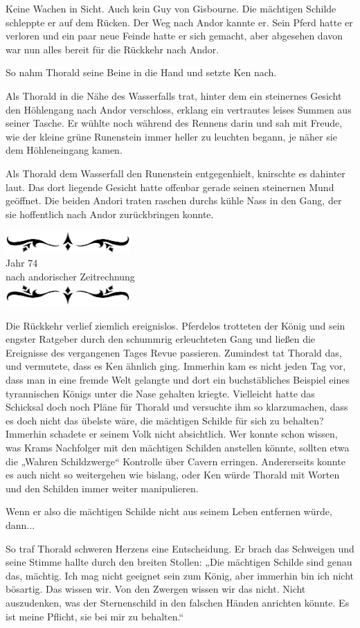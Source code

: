 \documentclass[10pt, a4paper, oneside]{book}
\newcommand{\az}[1]{%
    \begin{center}
        \includegraphics[width=180px]{Das Erbe des Wunderkindes/verzierung1.png}\\
        {\Huge #1} \\
        {nach andorischer Zeitrechnung}\\
        \includegraphics[width=180px]{Das Erbe des Wunderkindes/verzierung2.png}
    \end{center}
    \extramarks{}{#1 a.Z.}
}
\begin{document}
Keine Wachen in Sicht. Auch kein Guy von Gisbourne. Die mächtigen Schilde schleppte er auf dem Rücken. Der Weg nach Andor kannte er. Sein Pferd hatte er verloren und ein paar neue Feinde hatte er sich gemacht, aber abgesehen davon war nun alles bereit für die Rückkehr nach Andor.

So nahm Thorald seine Beine in die Hand und setzte Ken nach.\bigskip







Als Thorald in die Nähe des Wasserfalls trat, hinter dem ein steinernes Gesicht den Höhlengang nach Andor verschloss, erklang ein vertrautes leises Summen aus seiner Tasche. Er wühlte noch während des Rennens darin und sah mit Freude, wie der kleine grüne Runenstein immer heller zu leuchten begann, je näher sie dem Höhleneingang kamen.

Als Thorald dem Wasserfall den Runenstein entgegenhielt, knirschte es dahinter laut. Das dort liegende Gesicht hatte offenbar gerade seinen steinernen Mund geöffnet. Die beiden Andori traten raschen durchs kühle Nass in den Gang, der sie hoffentlich nach Andor zurückbringen konnte.

\az{Jahr 74}

Die Rückkehr verlief ziemlich ereignislos. Pferdelos trotteten der König und sein engster Ratgeber durch den schummrig erleuchteten Gang und ließen die Ereignisse des vergangenen Tages Revue passieren. Zumindest tat Thorald das, und vermutete, dass es Ken ähnlich ging. Immerhin kam es nicht jeden Tag vor, dass man in eine fremde Welt gelangte und dort ein buchstäbliches Beispiel eines tyrannischen Königs unter die Nase gehalten kriegte. Vielleicht hatte das Schicksal doch noch Pläne für Thorald und versuchte ihm so klarzumachen, dass es doch nicht das übelste wäre, die mächtigen Schilde für sich zu behalten? Immerhin schadete er seinem Volk nicht absichtlich. Wer konnte schon wissen, was Krams Nachfolger mit den mächtigen Schilden anstellen könnte, sollten etwa die „Wahren Schildzwerge“ Kontrolle über Cavern erringen. Andererseits konnte es auch nicht so weitergehen wie bislang, oder Ken würde Thorald mit Worten und den Schilden immer weiter manipulieren.

Wenn er also die mächtigen Schilde nicht aus seinem Leben entfernen würde, dann...

So traf Thorald schweren Herzens eine Entscheidung. Er brach das Schweigen und seine Stimme hallte durch den breiten Stollen: „Die mächtigen Schilde sind genau das, mächtig. Ich mag nicht geeignet sein zum König, aber immerhin bin ich nicht bösartig. Das wissen wir. Von den Zwergen wissen wir das nicht. Nicht auszudenken, was der Sternenschild in den falschen Händen anrichten könnte. Es ist meine Pflicht, sie bei mir zu behalten.“
\end{document}
